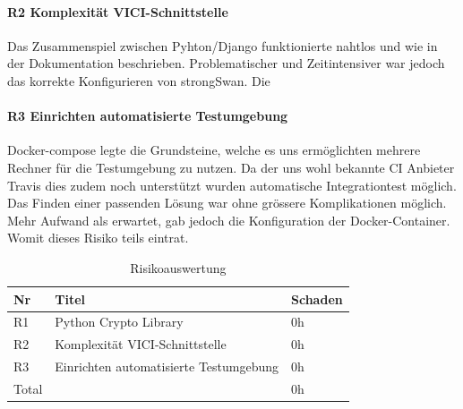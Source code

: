 \paragraph{R2 Komplexität VICI-Schnittstelle} Das Zusammenspiel zwischen Pyhton/Django funktionierte nahtlos und wie in der Dokumentation beschrieben. Problematischer und Zeitintensiver war jedoch das korrekte Konfigurieren von strongSwan. Die 

\paragraph{R3 Einrichten automatisierte Testumgebung}
Docker-compose legte die Grundsteine, welche es uns ermöglichten mehrere Rechner für die Testumgebung zu nutzen. Da der uns wohl bekannte CI Anbieter Travis dies zudem noch unterstützt wurden automatische Integrationtest möglich. Das Finden einer passenden Lösung war ohne grössere Komplikationen möglich. Mehr Aufwand als erwartet, gab jedoch die Konfiguration der Docker-Container. Womit dieses Risiko teils eintrat.\\
\medskip
\begin{table}[H]
	\centering
    \begin{tabular}{|p{2cm}|l|p{2cm}|}
    \hline    
    \rowcolor{lightblue}
	Nr & Titel & Schaden \\ \hline   
	R1 & Python Crypto Library & 0h \\ \hline
	R2 & Komplexität VICI-Schnittstelle & 0h \\ \hline
	R3 & Einrichten automatisierte Testumgebung& 0h \\ \hline
	\rowcolor{lightblue}
	Total &  & 0h \\ \hline
    \end{tabular}
    \caption[Risikoauswertung]{Risikoauswertung}
\end{table}
